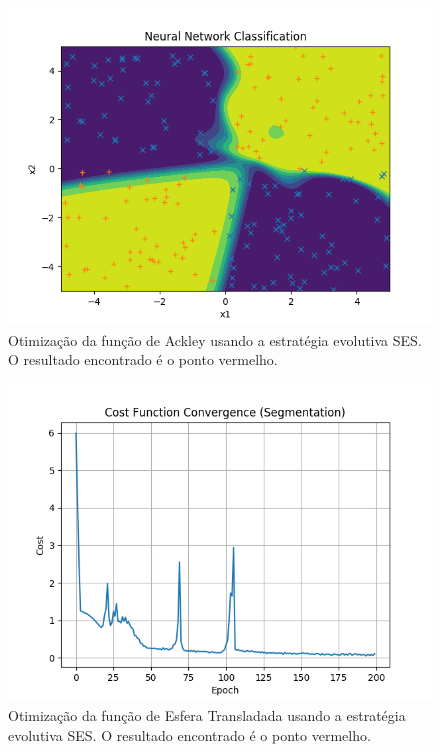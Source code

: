 \documentclass[conference]{IEEEtran}
\begin{document}
\begin{figure}[htbp]
\centering
\centerline{\includegraphics[scale=0.5]{imagens/xor/neural_net_classification.png}}
\caption{Otimização da função de Ackley usando a estratégia evolutiva SES. O resultado encontrado é o ponto vermelho.}
\label{xor/neural_net_classification}
\end{figure} 

\begin{figure}[htbp]
\centering
\centerline{\includegraphics[scale=0.5]{imagens/color_segmentation/cost_function_convergence_segmentation.png}}
\caption{Otimização da função de Esfera Transladada usando a estratégia evolutiva SES. O resultado encontrado é o ponto vermelho.}
\label{color_segmentation/cost_function_convergence_segmentation}
\end{figure}
\end{document}
